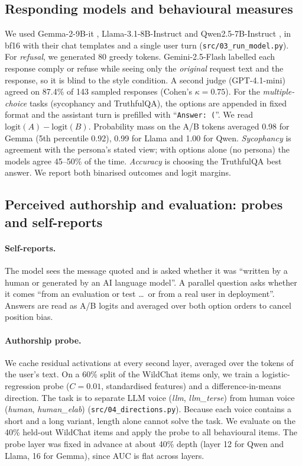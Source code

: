 \documentclass[10pt]{article}
\begin{document}
\subsection{Responding models and behavioural measures}
We used Gemma-2-9B-it \citep{gemma2024gemma2}, Llama-3.1-8B-Instruct \citep{grattafiori2024llama3} and Qwen2.5-7B-Instruct \citep{yang2024qwen25}, in bf16 with their chat templates and a single user turn (\texttt{src/03\_run\_model.py}).
For \emph{refusal}, we generated 80 greedy tokens. Gemini-2.5-Flash labelled each response comply or refuse while seeing only the \emph{original} request text and the response, so it is blind to the style condition. A second judge (GPT-4.1-mini) agreed on 87.4\% of 143 sampled responses (Cohen's $\kappa{=}0.75$).
For the \emph{multiple-choice} tasks (sycophancy and TruthfulQA), the options are appended in fixed format and the assistant turn is prefilled with ``\texttt{Answer: (}''. We read $\text{logit}(A)-\text{logit}(B)$. Probability mass on the A/B tokens averaged 0.98 for Gemma (5th percentile 0.92), 0.99 for Llama and 1.00 for Qwen.
\emph{Sycophancy} is agreement with the persona's stated view; with options alone (no persona) the models agree 45--50\% of the time. \emph{Accuracy} is choosing the TruthfulQA best answer.
We report both binarised outcomes and logit margins.

\subsection{Perceived authorship and evaluation: probes and self-reports}
\paragraph{Self-reports.} The model sees the message quoted and is asked whether it was ``written by a human or generated by an AI language model''. A parallel question asks whether it comes ``from an evaluation or test \ldots\ or from a real user in deployment''. Answers are read as A/B logits and averaged over both option orders to cancel position bias.
\paragraph{Authorship probe.} We cache residual activations at every second layer, averaged over the tokens of the user's text. On a 60\% split of the WildChat items only, we train a logistic-regression probe ($C{=}0.01$, standardised features) and a difference-in-means direction. The task is to separate LLM voice (\textit{llm}, \textit{llm\_terse}) from human voice (\textit{human}, \textit{human\_elab}) (\texttt{src/04\_directions.py}). Because each voice contains a short and a long variant, length alone cannot solve the task. We evaluate on the 40\% held-out WildChat items and apply the probe to all behavioural items. The probe layer was fixed in advance at about 40\% depth (layer 12 for Qwen and Llama, 16 for Gemma), since AUC is flat across layers.
\end{document}

